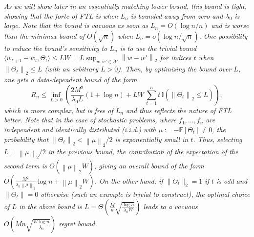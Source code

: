 \documentclass[english]{article}
\newcommand{\cW}{\mathcal{W}}
\newcommand{\Exp}[1]{\mathbb{E}\left[ #1 \right]}
\newcommand{\ind}{\mathbb{I}}
\newcommand{\one}[1]{\ind\left(#1\right)}
\newcommand{\ip}[1]{\langle#1\rangle}
\newcommand{\norm}[1]{\left\| #1 \right\|}
\begin{document}
\begin{remark} \em
As we will show later in an essentially matching lower bound, this bound is tight, showing that the forte  %
of FTL is when $L_n$ %
is bounded away from zero and $\lambda_0$ is large.
Note that the bound is vacuous as soon as $L_n =O( \log n/n )$
and is worse than the minimax bound of $O(\sqrt{n})$ when $L _n = o( \log n/\sqrt{n} )$. 
One possibility to reduce the bound's sensitivity to $L_n$  
is to use the trivial bound $\ip{w_{t+1}-w_t,\Theta_t} \le L W = L \sup_{w,w'\in \cW} \norm{w-w'}_2$ 
for indices $t$ when $\norm{\Theta_t}_2\le L$ (with an arbitrary $L>0$). Then, by optimizing the bound over $L$, 
one gets a data-dependent bound
of the form 
\begin{equation}
\label{eq:Lbound}
R_n \le \inf_{L>0} \left(\frac{2M^2}{\lambda_0 L} (1+\log n) +  LW \, \sum_{t=1}^n t \,\one{ \norm{\Theta_t}_2\le L }\right),
\end{equation}
which is more complex, but is free of $L_n$ and thus reflects the nature of FTL better.
Note that in the case of stochastic problems, where $f_1,\ldots,f_n$ are independent and identically distributed (i.i.d.) with $\mu := -\Exp{\Theta_t}\ne 0$, the probability that $\norm{\Theta_t}_2 < \norm{\mu}_2/2$ is exponentially small in $t$. Thus, selecting $L=\norm{\mu}_2/2$ in the previous bound, the contribution of the expectation of the second term is $O(\norm{\mu}_2W)$, giving an overall bound of the form $O(\frac{M^2}{\lambda_0 \norm{\mu}_2}\log n+\norm{\mu}_2 W)$. 
On the other hand, if $\|\Theta_t\|_2 = 1$ if $t$ is odd and $\|\Theta_t\| = 0$ otherwise (such an example is trivial to construct), the optimal choice of $L$ in the above bound is $L= \Theta\left(\frac{M}{n}\sqrt{\frac{\log n}{\lambda_0 W}}\right)$ leads to a vacuous $O\left(Mn\sqrt{\frac{W\log n}{\lambda_0}}\right)$ regret bound.
\end{remark}
\end{document}
